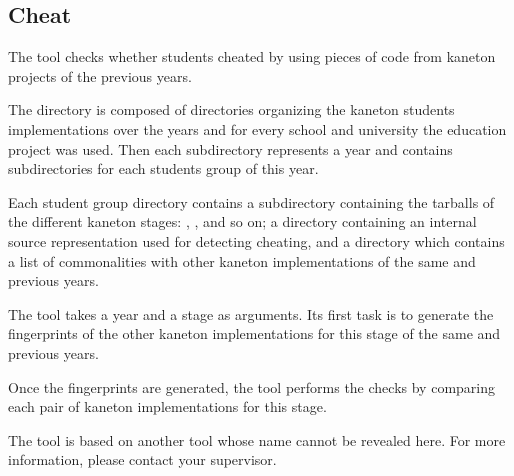 %
%
%
%
%
%

%
%

\subsection{Cheat}
\label{section:cheat}

The  tool checks whether students cheated by using pieces of
code from kaneton projects of the previous years.

The  directory is composed of directories organizing the
kaneton students implementations over the years and for every school and
university the education project was used. Then each subdirectory represents
a year and contains subdirectories for each students group of this year.

Each student group directory contains a  subdirectory
containing the tarballs of the different kaneton stages: ,
,  and so on; a  directory
containing an internal source representation used for detecting cheating,
and a  directory which contains a list of commonalities
with other kaneton implementations of the same and previous years.

The  tool takes a year and a stage as arguments. Its first
task is to generate the fingerprints of the other kaneton implementations
for this stage of the same and previous years.

Once the fingerprints are generated, the tool performs the checks by
comparing each pair of kaneton implementations for this stage.

The  tool is based on another tool whose name cannot be revealed
here. For more information, please contact your supervisor.
